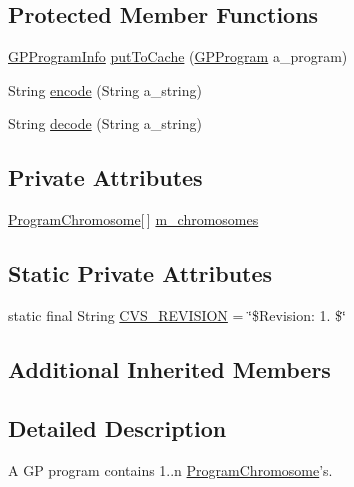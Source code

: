 \subsection*{Protected Member Functions}
\begin{DoxyCompactItemize}
\item 
\hyperlink{classorg_1_1jgap_1_1gp_1_1impl_1_1_g_p_program_info}{G\-P\-Program\-Info} \hyperlink{classorg_1_1jgap_1_1gp_1_1impl_1_1_g_p_program_ad7f7325e72d6e61364cde12724409c5c}{put\-To\-Cache} (\hyperlink{classorg_1_1jgap_1_1gp_1_1impl_1_1_g_p_program}{G\-P\-Program} a\-\_\-program)
\item 
String \hyperlink{classorg_1_1jgap_1_1gp_1_1impl_1_1_g_p_program_aab6c5da90ae01391bac8a116418554a4}{encode} (String a\-\_\-string)
\item 
String \hyperlink{classorg_1_1jgap_1_1gp_1_1impl_1_1_g_p_program_a0a1231afda708bdb49aa727c26004ab3}{decode} (String a\-\_\-string)
\end{DoxyCompactItemize}
\subsection*{Private Attributes}
\begin{DoxyCompactItemize}
\item 
\hyperlink{classorg_1_1jgap_1_1gp_1_1impl_1_1_program_chromosome}{Program\-Chromosome}\mbox{[}$\,$\mbox{]} \hyperlink{classorg_1_1jgap_1_1gp_1_1impl_1_1_g_p_program_a0781913272a939c3c511d4139d233084}{m\-\_\-chromosomes}
\end{DoxyCompactItemize}
\subsection*{Static Private Attributes}
\begin{DoxyCompactItemize}
\item 
static final String \hyperlink{classorg_1_1jgap_1_1gp_1_1impl_1_1_g_p_program_ad52d02bd69b0ff3bb09316b000b1b92e}{C\-V\-S\-\_\-\-R\-E\-V\-I\-S\-I\-O\-N} = \char`\"{}\$Revision\-: 1. \$\char`\"{}
\end{DoxyCompactItemize}
\subsection*{Additional Inherited Members}


\subsection{Detailed Description}
A G\-P program contains 1..n \hyperlink{classorg_1_1jgap_1_1gp_1_1impl_1_1_program_chromosome}{Program\-Chromosome}'s.

